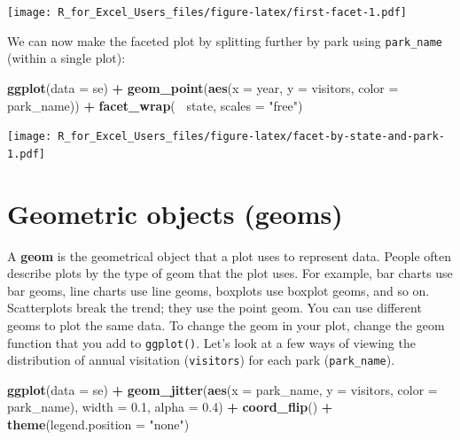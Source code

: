 \documentclass[]{book}
\newenvironment{Shaded}{\begin{snugshade}}{\end{snugshade}}
\newcommand{\DataTypeTok}[1]{\textcolor[rgb]{0.13,0.29,0.53}{#1}}
\newcommand{\FloatTok}[1]{\textcolor[rgb]{0.00,0.00,0.81}{#1}}
\newcommand{\KeywordTok}[1]{\textcolor[rgb]{0.13,0.29,0.53}{\textbf{#1}}}
\newcommand{\NormalTok}[1]{#1}
\newcommand{\OperatorTok}[1]{\textcolor[rgb]{0.81,0.36,0.00}{\textbf{#1}}}
\newcommand{\StringTok}[1]{\textcolor[rgb]{0.31,0.60,0.02}{#1}}
\begin{document}
\texttt{[image: R\_for\_Excel\_Users\_files/figure-latex/first-facet-1.pdf]}

We can now make the faceted plot by splitting further by park using \texttt{park\_name} (within a single plot):

\begin{Shaded}
\begin{Highlighting}[]
 \KeywordTok{ggplot}\NormalTok{(}\DataTypeTok{data =}\NormalTok{ se) }\OperatorTok{+}
\StringTok{     }\KeywordTok{geom_point}\NormalTok{(}\KeywordTok{aes}\NormalTok{(}\DataTypeTok{x =}\NormalTok{ year, }\DataTypeTok{y =}\NormalTok{ visitors, }\DataTypeTok{color =}\NormalTok{ park_name)) }\OperatorTok{+}
\StringTok{     }\KeywordTok{facet_wrap}\NormalTok{(}\OperatorTok{~}\StringTok{ }\NormalTok{state, }\DataTypeTok{scales =} \StringTok{"free"}\NormalTok{)}
\end{Highlighting}
\end{Shaded}

\texttt{[image: R\_for\_Excel\_Users\_files/figure-latex/facet-by-state-and-park-1.pdf]}

\hypertarget{geometric-objects-geoms}{%
\section{Geometric objects (geoms)}\label{geometric-objects-geoms}}

A \textbf{geom} is the geometrical object that a plot uses to represent data. People often describe plots by the type of geom that the plot uses. For example, bar charts use bar geoms, line charts use line geoms, boxplots use boxplot geoms, and so on. Scatterplots break the trend; they use the point geom. You can use different geoms to plot the same data. To change the geom in your plot, change the geom function that you add to \texttt{ggplot()}. Let's look at a few ways of viewing the distribution of annual visitation (\texttt{visitors}) for each park (\texttt{park\_name}).

\begin{Shaded}
\begin{Highlighting}[]
\KeywordTok{ggplot}\NormalTok{(}\DataTypeTok{data =}\NormalTok{ se) }\OperatorTok{+}\StringTok{ }
\StringTok{  }\KeywordTok{geom_jitter}\NormalTok{(}\KeywordTok{aes}\NormalTok{(}\DataTypeTok{x =}\NormalTok{ park_name, }\DataTypeTok{y =}\NormalTok{ visitors, }\DataTypeTok{color =}\NormalTok{ park_name), }
              \DataTypeTok{width =} \FloatTok{0.1}\NormalTok{, }
              \DataTypeTok{alpha =} \FloatTok{0.4}\NormalTok{) }\OperatorTok{+}
\StringTok{  }\KeywordTok{coord_flip}\NormalTok{() }\OperatorTok{+}
\StringTok{  }\KeywordTok{theme}\NormalTok{(}\DataTypeTok{legend.position =} \StringTok{"none"}\NormalTok{) }
\end{Highlighting}
\end{Shaded}
\end{document}

